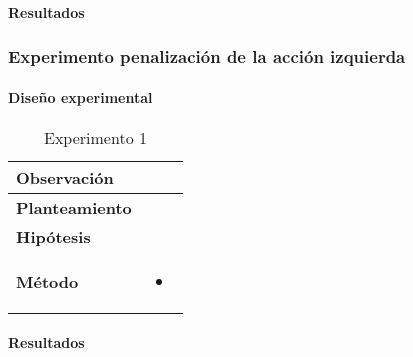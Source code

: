 \paragraph{Resultados}

\subsubsection{Experimento penalización de la acción izquierda}

\paragraph{Diseño experimental}

\begin{table}[H]
    \centering
    \begin{tabularx}{\textwidth}{|p{4cm}|X|} %
        \hline %
        \textbf{Observación} &  
        \\ \hline 
        \textbf{Planteamiento} & 
        \\ \hline 
        \textbf{Hipótesis} & 
        \\ \hline 
        \textbf{Método} & 
        \begin{itemize}
            \item 
        \end{itemize}
        \\ \hline
    \end{tabularx}
    \caption{Experimento 1}
    \label{tab:tabla1}
\end{table}

\paragraph{Resultados}